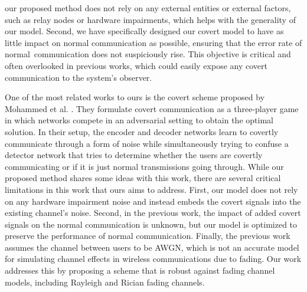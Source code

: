 our proposed method does not rely on any external entities or external factors, such as relay nodes or hardware impairments, which helps with the generality of our model. Second, we have specifically designed our covert model to have as little impact on normal communication as possible, ensuring that the error rate of normal communication does not suspiciously rise. This objective is critical and often overlooked in previous works, which could easily expose any covert communication to the system's observer.

One of the most related works to ours is the covert scheme proposed by Mohammed et al. \cite{mohammed2021adversarial}. They formulate covert communication as a three-player game in which networks compete in an adversarial setting to obtain the optimal solution. In their setup, the encoder and decoder networks learn to covertly communicate through a form of noise while simultaneously trying to confuse a detector network that tries to determine whether the users are covertly communicating or if it is just normal transmissions going through. While our proposed method shares some ideas with this work, there are several critical limitations in this work that ours aims to address. First, our model does not rely on any hardware impairment noise and instead embeds the covert signals into the existing channel's noise. Second, in the previous work, the impact of added covert signals on the normal communication is unknown, but our model is optimized to preserve the performance of normal communication. Finally, the previous work assumes the channel between users to be AWGN, which is not an accurate model for simulating channel effects in wireless communications due to fading. Our work addresses this by proposing a scheme that is robust against fading channel models, including Rayleigh and Rician fading channels.